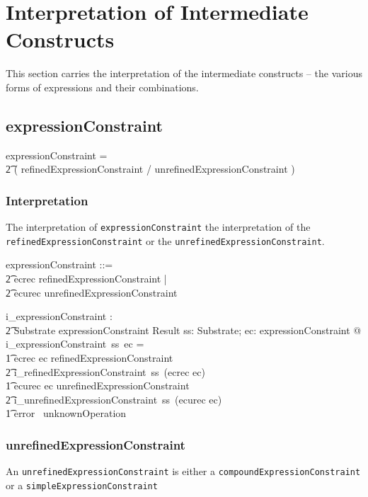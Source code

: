 \documentclass{article}
\def\spec#1{{\tt #1}}
\begin{document}
\section{Interpretation of Intermediate Constructs}
This section carries the interpretation of the intermediate constructs -- the various forms
of expressions and their combinations.
\subsection{expressionConstraint}
\begin{framed}
expressionConstraint = \\
\t2 ( refinedExpressionConstraint / unrefinedExpressionConstraint ) 
\end{framed}

\subsubsection{Interpretation}
The interpretation of \spec{expressionConstraint} the interpretation of the  \spec{refinedExpressionConstraint}
or the \spec{unrefinedExpressionConstraint}.
\begin{zed}
expressionConstraint ::= \\
\t2 ecrec \ldata refinedExpressionConstraint \rdata | \\
\t2 ecurec \ldata unrefinedExpressionConstraint \rdata \\
\end{zed}


\begin{gendef}
   i\_expressionConstraint : \\
\t2 Substrate \fun expressionConstraint \fun Result
\where
   \forall ss: Substrate; ec: expressionConstraint @ i\_expressionConstraint~ss~ec = \\
\t1 \IF ecrec \inv ec \in refinedExpressionConstraint \\
\t2 \THEN i\_refinedExpressionConstraint~ss~(ecrec \inv ec) \\
\t1 \ELSE \IF ecurec \inv ec \in unrefinedExpressionConstraint \\
\t2 \THEN i\_unrefinedExpressionConstraint~ss~(ecurec \inv ec) \\
\t1 \ELSE error~ unknownOperation
\end{gendef}

\subsubsection{unrefinedExpressionConstraint}
An \spec{unrefinedExpressionConstraint} is either a \spec{compoundExpressionConstraint} or a \spec{simpleExpressionConstraint}
\end{document}
